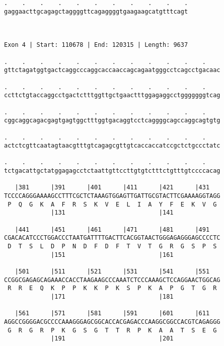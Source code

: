 \documentclass{article}
\begin{document}
\begin{Verbatim}
.    .    .    .    .    .    .    .    .    .    .
gaggaacttgcagagctaggggttcagaggggtgaagaagcatgtttcagt
                                                   
                                                   
 
Exon 4 | Start: 110678 | End: 120315 | Length: 9637
 
.    .    .    .    .    .    .    .    .    .    .    .    
gttctagatggtgactcaggcccaggcaccaaccagcagaatgggcctcagcctgacaac
                                                            
.    .    .    .    .    .    .    .    .    .    .    .    
ccttctgtaccaggcctgactctttggttgctgaactttggagaggcctgggggggtcag
                                                            
.    .    .    .    .    .    .    .    .    .    .    .    
cggcaggcagacgagtgagtggctttggtgacaggtcctcaggggcagccaggcagtgtg
                                                            
.    .    .    .    .    .    .    .    .    .    .    .    
actctcgttcaatagtaacgtttgtcagagcgttgtcaccaccatccgctctgccctatc
                                                            
.    .    .    .    .    .    .    .    .    .    .    .    
tctgacattgctatggagagcctctaattgttccttgtgtctttctgtttgtccccacag
                                                            
   |381      |391      |401      |411      |421      |431   
TCCCCAGGGAAAAGCCTTTCGCTCTAAAGTGGAGTTGATTGCGTACTTCGAAAAGGTAGG
 P  Q  G  K  A  F  R  S  K  V  E  L  I  A  Y  F  E  K  V  G 
             |131                          |141             
  
   |441      |451      |461      |471      |481      |491   
CGACACATCCCTGGACCCTAATGATTTTGACTTCACGGTAACTGGGAGAGGGAGCCCCTC
 D  T  S  L  D  P  N  D  F  D  F  T  V  T  G  R  G  S  P  S 
             |151                          |161             
  
   |501      |511      |521      |531      |541      |551   
CCGGCGAGAGCAGAAACCACCTAAGAAGCCCAAATCTCCCAAAGCTCCAGGAACTGGCAG
 R  R  E  Q  K  P  P  K  K  P  K  S  P  K  A  P  G  T  G  R 
             |171                          |181             
  
   |561      |571      |581      |591      |601      |611   
AGGCCGGGGACGCCCCAAAGGGAGCGGCACCACGAGACCCAAGGCGGCCACGTCAGAGGG
 G  R  G  R  P  K  G  S  G  T  T  R  P  K  A  A  T  S  E  G 
             |191                          |201             
  

\end{Verbatim}
\end{document}
